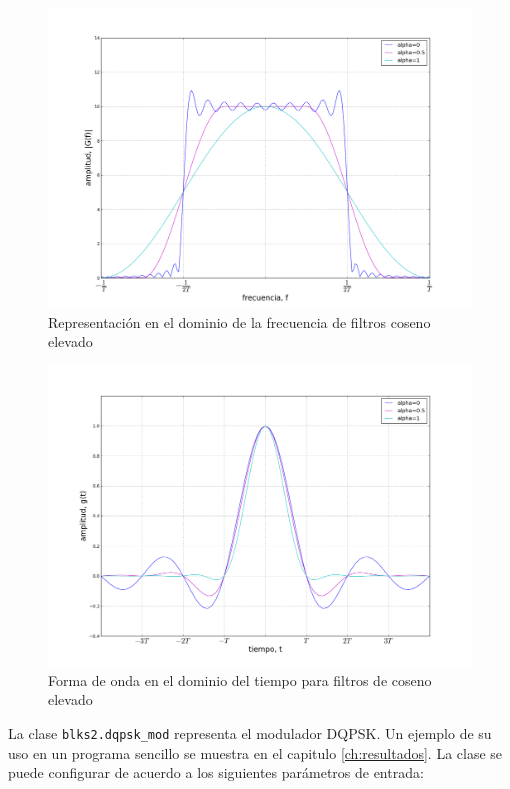 \begin{figure}[htp]
  \centering
  \includegraphics[width=5.9in]{figs/rrcfreq}
  \vspace{0.3in}
  \caption{Representaci\'on en el dominio de la frecuencia de filtros coseno elevado}
  \label{fig:rrcfreq}
\end{figure}

\begin{figure}[htp]
  \centering
  \includegraphics[width=5.9in]{figs/rrctime}
  \vspace{0.3in}
  \caption{Forma de onda en el dominio del tiempo para filtros de coseno elevado}
  \label{fig:rrctime}
\end{figure}

La clase \verb|blks2.dqpsk_mod| representa el modulador DQPSK. Un ejemplo de su uso en un programa sencillo se muestra en el
capitulo \ref{ch:resultados}. La clase se puede configurar de acuerdo a los siguientes par\'ametros de entrada:

